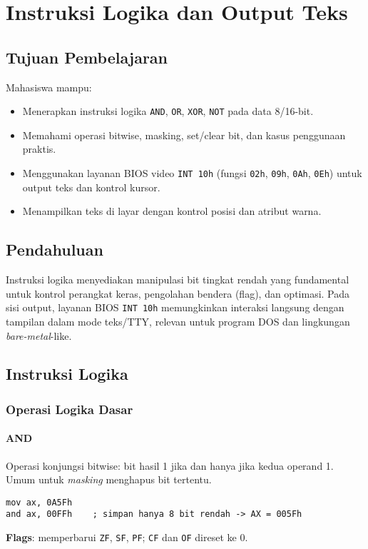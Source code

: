 \chapter{Instruksi Logika dan Output Teks}

\section{Tujuan Pembelajaran}
Mahasiswa mampu:
\begin{itemize}
    \item Menerapkan instruksi logika \texttt{AND}, \texttt{OR}, \texttt{XOR}, \texttt{NOT} pada data 8/16-bit.
    \item Memahami operasi bitwise, masking, set/clear bit, dan kasus penggunaan praktis.
    \item Menggunakan layanan BIOS video \texttt{INT 10h} (fungsi \texttt{02h}, \texttt{09h}, \texttt{0Ah}, \texttt{0Eh}) untuk output teks dan kontrol kursor.
    \item Menampilkan teks di layar dengan kontrol posisi dan atribut warna.
\end{itemize}

\section{Pendahuluan}
Instruksi logika menyediakan manipulasi bit tingkat rendah yang fundamental untuk kontrol perangkat keras, pengolahan bendera (flag), dan optimasi. Pada sisi output, layanan BIOS \texttt{INT 10h} memungkinkan interaksi langsung dengan tampilan dalam mode teks/TTY, relevan untuk program DOS dan lingkungan \textit{bare-metal}-like.

\section{Instruksi Logika}
\subsection{Operasi Logika Dasar}
\subsubsection{AND}
Operasi konjungsi bitwise: bit hasil 1 jika dan hanya jika kedua operand 1. Umum untuk \textit{masking} menghapus bit tertentu.
\begin{verbatim}
mov ax, 0A5Fh
and ax, 00FFh    ; simpan hanya 8 bit rendah -> AX = 005Fh
\end{verbatim}
\textbf{Flags}: memperbarui \texttt{ZF}, \texttt{SF}, \texttt{PF}; \texttt{CF} dan \texttt{OF} direset ke 0.

